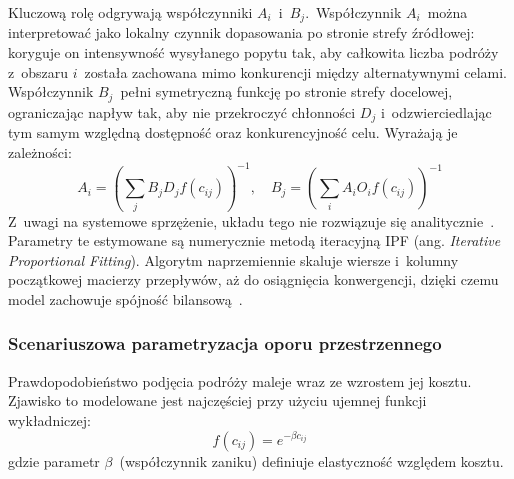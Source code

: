 \documentclass{pracamgr}
\begin{document}
Kluczową rolę odgrywają współczynniki $A_i$~i~$B_j$.~Współczynnik $A_i$~można interpretować jako lokalny czynnik dopasowania po stronie strefy źródłowej: koryguje on intensywność wysyłanego popytu tak, aby całkowita liczba podróży z~obszaru $i$~została zachowana mimo konkurencji między alternatywnymi celami. Współczynnik $B_j$~pełni symetryczną funkcję po stronie strefy docelowej, ograniczając napływ tak, aby nie przekroczyć chłonności $D_j$ i~odzwierciedlając tym samym względną dostępność oraz konkurencyjność celu. Wyrażają je zależności:
$$A_i = \left( \sum_{j} B_j D_j f(c_{ij}) \right)^{-1}, \quad B_j = \left( \sum_{i} A_i O_i f(c_{ij}) \right)^{-1}$$
Z~uwagi na systemowe sprzężenie, układu tego nie rozwiązuje się analitycznie~\cite{gravity2}. Parametry te estymowane są numerycznie metodą iteracyjną IPF (ang. \textit{Iterative Proportional Fitting}). Algorytm naprzemiennie skaluje wiersze i~kolumny początkowej macierzy przepływów, aż do osiągnięcia konwergencji, dzięki czemu model zachowuje spójność bilansową~\cite{ipf, wiki:ipf}.

\subsubsection{Scenariuszowa parametryzacja oporu przestrzennego}

Prawdopodobieństwo podjęcia podróży maleje wraz ze wzrostem jej kosztu. Zjawisko to modelowane jest najczęściej przy użyciu ujemnej funkcji wykładniczej:
$$f(c_{ij}) = e^{- \beta c_{ij}}$$
gdzie parametr $\beta$~(współczynnik zaniku) definiuje elastyczność względem kosztu.
\end{document}
